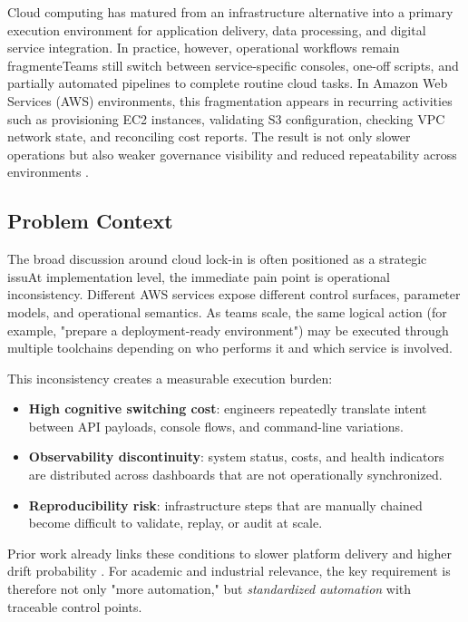 Cloud computing has matured from an infrastructure alternative into a primary execution environment for application delivery, data processing, and digital service integration. In practice, however, operational workflows remain fragmenteTeams still switch between service-specific consoles, one-off scripts, and partially automated pipelines to complete routine cloud tasks. In Amazon Web Services (AWS) environments, this fragmentation appears in recurring activities such as provisioning EC2 instances, validating S3 configuration, checking VPC network state, and reconciling cost reports. The result is not only slower operations but also weaker governance visibility and reduced repeatability across environments \cite{cloud_governance_2024, morris2016iac}.

\subsection{Problem Context}
The broad discussion around cloud lock-in is often positioned as a strategic issuAt implementation level, the immediate pain point is operational inconsistency. Different AWS services expose different control surfaces, parameter models, and operational semantics. As teams scale, the same logical action (for example, "prepare a deployment-ready environment") may be executed through multiple toolchains depending on who performs it and which service is involved.

This inconsistency creates a measurable execution burden:
\begin{itemize}
    \item \textbf{High cognitive switching cost}: engineers repeatedly translate intent between API payloads, console flows, and command-line variations.
    \item \textbf{Observability discontinuity}: system status, costs, and health indicators are distributed across dashboards that are not operationally synchronized.
    \item \textbf{Reproducibility risk}: infrastructure steps that are manually chained become difficult to validate, replay, or audit at scale.
\end{itemize}

Prior work already links these conditions to slower platform delivery and higher drift probability \cite{karamitsos2023multicloud, idc2024skills}. For academic and industrial relevance, the key requirement is therefore not only "more automation," but \textit{standardized automation} with traceable control points.

